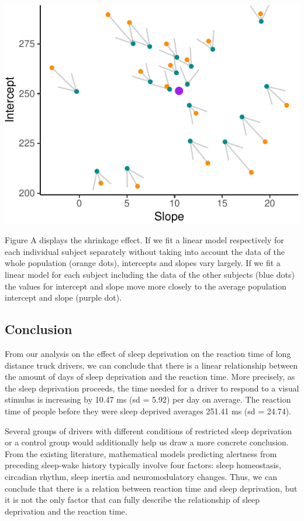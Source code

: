 \documentclass[
]{article}
\begin{document}
\begin{center}\includegraphics{common_sleep_files/figure-latex/unnamed-chunk-9-1} \end{center}

Figure A displays the shrinkage effect. If we fit a linear model
respectively for each individual subject separately without taking into
account the data of the whole population (orange dots), intercepts and
slopes vary largely. If we fit a linear model for each subject including
the data of the other subjects (blue dots) the values for intercept and
slope move more closely to the average population intercept and slope
(purple dot).

\hypertarget{conclusion}{%
\subsection{Conclusion}\label{conclusion}}

From our analysis on the effect of sleep deprivation on the reaction
time of long distance truck drivers, we can conclude that there is a
linear relationship between the amount of days of sleep deprivation and
the reaction time. More precisely, as the sleep deprivation proceeds,
the time needed for a driver to respond to a visual stimulus is
increasing by 10.47 ms (sd = 5.92) per day on average. The reaction time
of people before they were sleep deprived averages 251.41 ms (sd =
24.74).

Several groups of drivers with different conditions of restricted sleep
deprivation or a control group would additionally help us draw a more
concrete conclusion. From the existing literature, mathematical models
predicting alertness from preceding sleep-wake history typically involve
four factors: sleep homeostasis, circadian rhythm, sleep inertia and
neuromodulatory changes. Thus, we can conclude that there is a relation
between reaction time and sleep deprivation, but it is not the only
factor that can fully describe the relationship of sleep deprivation and
the reaction time.
\end{document}
